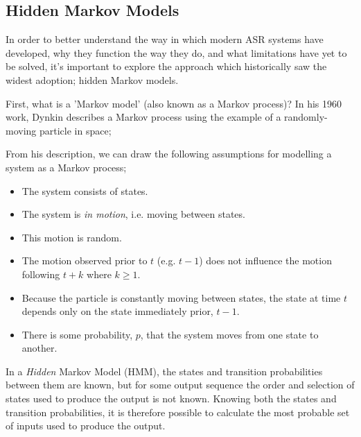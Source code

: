 \subsection{Hidden Markov Models}
In order to better understand the way in which modern ASR systems have developed, why they function the way they do, and what limitations have yet to be solved, it's important to explore the approach which historically saw the widest adoption; hidden Markov models.

First, what is a 'Markov model' (also known as a Markov process)?
In his 1960 work\cite{dynkin1960}, Dynkin describes a Markov process using the example of a randomly-moving particle in space;


From his description, we can draw the following assumptions for modelling a system as a Markov process;

\begin{itemize}
  \item The system consists of states.
  \item The system is \emph{in motion}, i.e. moving between states.
  \item This motion is random.
  \item The motion observed prior to $t$ (e.g. $t-1$) does not influence the motion following $t+k$ where $k \geq 1$.
  \item Because the particle is constantly moving between states, the state at time $t$ depends only on the state immediately prior, $t-1$.
  \item There is some probability, $p$, that the system moves from one state to another.
\end{itemize}

In a \emph{Hidden} Markov Model (HMM), the states and transition probabilities between them are known, but for some output sequence the order and selection of states used to produce the output is not known.
Knowing both the states and transition probabilities, it is therefore possible to calculate the most probable set of inputs used to produce the output.

